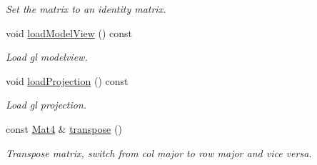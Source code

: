 \begin{DoxyCompactItemize}
\begin{DoxyCompactList}\small\item\em Set the matrix to an identity matrix. \item\end{DoxyCompactList}\item 
\hypertarget{classMat4_ab8a59432b5fa5ee98e336ce0b6aa1535}{
void \hyperlink{classMat4_ab8a59432b5fa5ee98e336ce0b6aa1535}{loadModelView} () const }
\label{classMat4_ab8a59432b5fa5ee98e336ce0b6aa1535}

\begin{DoxyCompactList}\small\item\em Load gl modelview. \item\end{DoxyCompactList}\item 
\hypertarget{classMat4_a421fdc614bb0b3e7346371aed1cf900c}{
void \hyperlink{classMat4_a421fdc614bb0b3e7346371aed1cf900c}{loadProjection} () const }
\label{classMat4_a421fdc614bb0b3e7346371aed1cf900c}

\begin{DoxyCompactList}\small\item\em Load gl projection. \item\end{DoxyCompactList}\item 
const \hyperlink{classMat4}{Mat4} \& \hyperlink{classMat4_a822f5da810857bfd6f639c12aed6dd61}{transpose} ()
\begin{DoxyCompactList}\small\item\em Transpose matrix, switch from col major to row major and vice versa. \item\end{DoxyCompactList}\end{DoxyCompactItemize}
